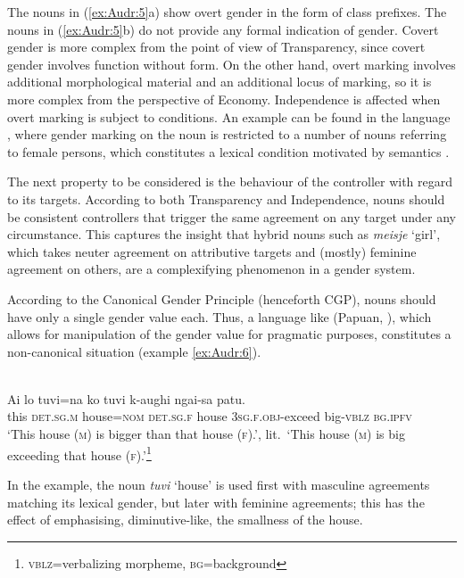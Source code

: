\documentclass[output=collectionpaper]{langsci/langscibook}
\begin{document}
The nouns in (\ref{ex:Audr:5}a) show overt gender in the form of class prefixes. The nouns in (\ref{ex:Audr:5}b) do not provide any formal indication of gender. Covert gender is more complex from the point of view of Transparency, since covert gender involves function without form. On the other hand, overt marking involves additional morphological material and an additional locus of marking, so it is more complex from the perspective of Economy. Independence is affected when overt marking is subject to conditions. An example can be found in the  language , where gender marking on the noun is restricted to a number of nouns referring to female persons, which constitutes a lexical condition motivated by semantics \citep[57]{Steeman2011}.

The next property to be considered is the behaviour of the controller with regard to its targets. According to both Transparency and Independence, nouns should be consistent controllers that trigger the same agreement on any target under any circumstance. This captures the insight that hybrid nouns such as  \textit{meisje} `girl', which takes neuter agreement on attributive targets and (mostly) feminine agreement on others, are a complexifying phenomenon in a gender system.

According to the Canonical Gender Principle (henceforth CGP), nouns should have only a single gender value each. Thus, a language like  (Papuan, \citealt{Wegener2012}), which allows for manipulation of the gender value for pragmatic purposes, constitutes a non-canonical situation (example \ref{ex:Audr:6}).

\ea
\label{ex:Audr:6}
 \citep[64]{Wegener2012}\\
\gll Ai lo tuvi=na ko tuvi k-aughi ngai-sa patu.\\
     this \textsc{det.sg.m} house=\textsc{nom} \textsc{det.sg.f} house \textsc{3sg.f.obj}{}-exceed big-\textsc{vblz} \textsc{bg.ipfv}\\
\glt `This house (\textsc{m}) is bigger than that house (\textsc{f}).', lit.\ `This house (\textsc{m}) is big exceeding that house (\textsc{f}).'\footnote{\textsc{vblz}=verbalizing morpheme, \textsc{bg}=background}
\z

In the example, the noun \textit{tuvi} `house' is used first with masculine agreements matching its lexical gender, but later with feminine agreements; this has the effect of emphasising, diminutive-like, the smallness of the house.
\end{document}
